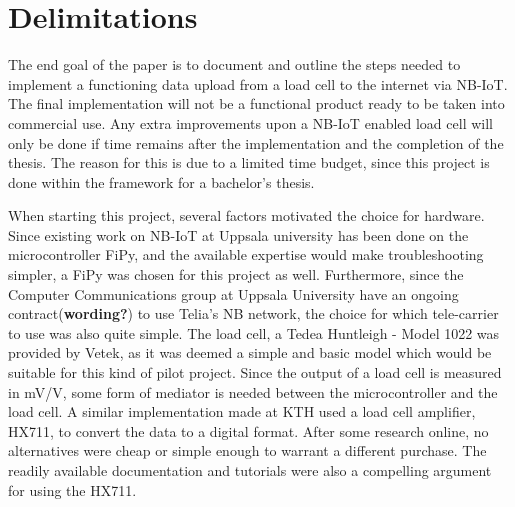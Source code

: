 \section{Delimitations}
The end goal of the paper is to document and outline the steps needed to implement a functioning data upload from a load cell to the internet via NB-IoT. The final implementation will not be a functional product ready to be taken into commercial use. Any extra improvements upon a NB-IoT enabled load cell will only be done if time remains after the implementation and the completion of the thesis. The reason for this is due to a limited time budget, since this project is done within the framework for a bachelor's thesis.

When starting this project, several factors motivated the choice for hardware. Since existing work on NB-IoT at Uppsala university has been done on the microcontroller FiPy, and the available expertise would make troubleshooting simpler, a FiPy was chosen for this project as well. Furthermore, since the Computer Communications group at Uppsala University have an ongoing contract(\textbf{wording?}) to use Telia's NB network, the choice for which tele-carrier to use was also quite simple. The load cell, a Tedea Huntleigh - Model 1022 was provided by Vetek, as it was deemed a simple and basic model which would be suitable for this kind of pilot project. Since the output of a load cell is measured in mV/V\cite{load-cell-spec}, some form of mediator is needed between the microcontroller and the load cell. A similar implementation made at KTH \cite{hospital} used a load cell amplifier, HX711, to convert the data to a digital format. After some research online, no alternatives were cheap or simple enough to warrant a different purchase. The readily available documentation and tutorials were also a compelling argument for using the HX711. 

